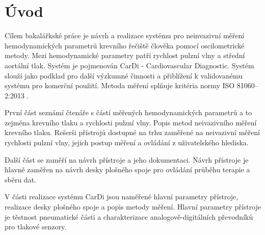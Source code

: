 \documentclass{ctuthesis}
\begin{document}
\maketitle



\chapter{Úvod}
Cílem bakalářkské práce je návrh a realizace systému pro neinvazivní měření hemodynamických parametrů krevního řečiště člověka pomocí oscilometrické metody. Mezi hemodynamické parametry patří rychlost pulzní vlny a střední aortální tlak.
Systém je pojmenován CarDi - Cardiovascular Diagnostic. Systém slouží jako podklad pro další výzkumné činnosti a přiblížení k validovanému systému pro komerční použití. Metoda měření splňuje kritéria normy ISO 81060–2:2013 \cite{cite:Validation}.

\par
První část seznámí čtenáře s částí měřených hemodynamických parametrů a to zejména krevního tlaku a rychlosti pulzní vlny. Popis metod neivazivního měření krevního tlaku. Rešerši přístrojů dostupné na trhu zaměřené na neivazivní měření rychlosti pulzní vlny, jejich postup měření a ovládání z uživatelského hlediska.
\par
Další část se zaměří na návrh přístroje a jeho dokumentaci. Návrh přístroje je hlavně zaměřen na návrh desky plošného spoje pro ovládání průběhu terapie a sběru dat.
\par
V části realizace systému CarDi jsou naměřené hlavní parametry přístroje, realizace desky plošného spoje a popis metody měření. Hlavní parametry přístroje je těstnost pneumatické části a charakterizace analogově-digitálních převodníků pro tlakové senzory.








\end{document}
